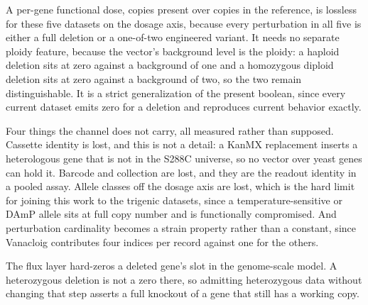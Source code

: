 A per-gene functional dose, copies present over copies in the reference, is lossless for
these five datasets on the dosage axis, because every perturbation in all five is either a
full deletion or a one-of-two engineered variant. It needs no separate ploidy feature,
because the vector's background level is the ploidy: a haploid deletion sits at zero against
a background of one and a homozygous diploid deletion sits at zero against a background of
two, so the two remain distinguishable. It is a strict generalization of the present
boolean, since every current dataset emits zero for a deletion and reproduces current
behavior exactly.

Four things the channel does not carry, all measured rather than supposed. Cassette identity
is lost, and this is not a detail: a KanMX replacement inserts a heterologous gene that is
not in the S288C universe, so no vector over yeast genes can hold it. Barcode and collection
are lost, and they are the readout identity in a pooled assay. Allele classes off the dosage
axis are lost, which is the hard limit for joining this work to the trigenic datasets, since
a temperature-sensitive or DAmP allele sits at full copy number and is functionally
compromised. And perturbation cardinality becomes a strain property rather than a constant,
since Vanacloig contributes four indices per record against one for the others.

The flux layer hard-zeros a deleted gene's slot in the genome-scale model. A heterozygous
deletion is not a zero there, so admitting heterozygous data without changing that step
asserts a full knockout of a gene that still has a working copy.
